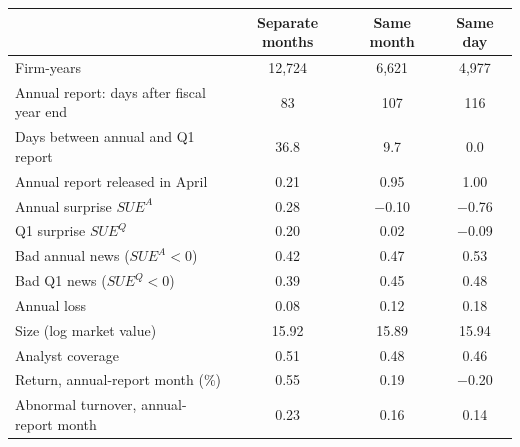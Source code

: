 \begin{tabular}{lccc}
\toprule
 & Separate months & Same month & Same day\\
\midrule
Firm-years & 12,724 & 6,621 & 4,977\\
Annual report: days after fiscal year end & 83 & 107 & 116\\
Days between annual and Q1 report & 36.8 & 9.7 & 0.0\\
Annual report released in April & 0.21 & 0.95 & 1.00\\
Annual surprise $SUE^{A}$ & 0.28 & \ensuremath{-}0.10 & \ensuremath{-}0.76\\
Q1 surprise $SUE^{Q}$ & 0.20 & 0.02 & \ensuremath{-}0.09\\
Bad annual news ($SUE^{A}<0$) & 0.42 & 0.47 & 0.53\\
Bad Q1 news ($SUE^{Q}<0$) & 0.39 & 0.45 & 0.48\\
Annual loss & 0.08 & 0.12 & 0.18\\
Size (log market value) & 15.92 & 15.89 & 15.94\\
Analyst coverage & 0.51 & 0.48 & 0.46\\
Return, annual-report month (\%) & 0.55 & 0.19 & \ensuremath{-}0.20\\
Abnormal turnover, annual-report month & 0.23 & 0.16 & 0.14\\
\bottomrule
\end{tabular}